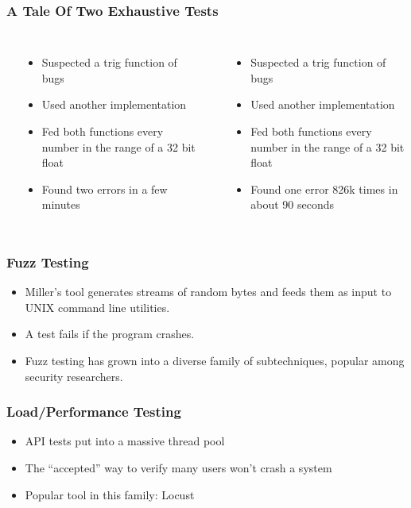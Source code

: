 \begin{frame}
\frametitle{A Tale Of Two Exhaustive Tests}
\begin{columns}[c]
    \textbf{\citet{hoffman2003Exhausting}}
    \begin{itemize}
      \item Suspected a trig function of bugs
      \item Used another implementation
      \item Fed both functions every number in the range of a 32 bit float
      \item Found two errors in a few minutes
    \end{itemize}
    \textbf{\citet{dawsonFourBillion}}
    \begin{itemize}
      \item Suspected a trig function of bugs
      \item Used another implementation
      \item Fed both functions every number in the range of a 32 bit float
      \item Found one error 826k times in about 90 seconds
    \end{itemize}
\end{columns}
\end{frame}

\begin{frame}
  \frametitle{Fuzz Testing}
  \begin{itemize}
    \item Miller's tool generates streams of random bytes and feeds them as input to UNIX command line utilities. \citep{miller1990empirical}
    \item A test fails if the program crashes.
    \item Fuzz testing has grown into a diverse family of subtechniques, popular among security researchers.
  \end{itemize}
\end{frame}

\begin{frame}
  \frametitle{Load/Performance Testing}
  \begin{itemize}
    \item API tests put into a massive thread pool
    \item The ``accepted'' way to verify many users won't crash a system
    \item Popular tool in this family: Locust \citep{heymanlocust}
  \end{itemize}
\end{frame}

